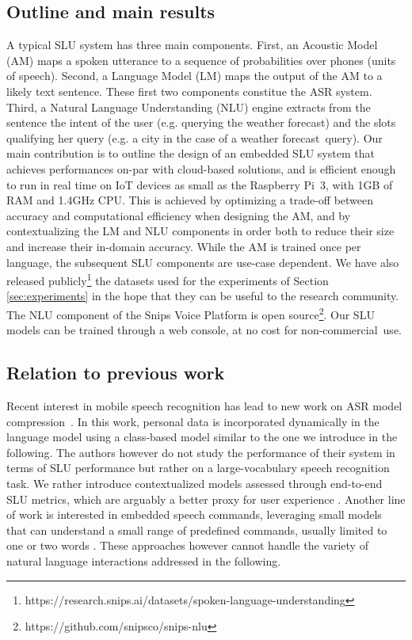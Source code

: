 \documentclass{article}
\begin{document}
\subsection{Outline and main results}
\label{sec:outline}
  A typical SLU system has three main components. 
  First, an Acoustic Model (AM) maps a spoken utterance to a sequence of probabilities over phones (units of speech). 
  Second, a Language Model (LM) maps the output of the AM to a likely text sentence. These first two components constitue the ASR system. Third, a Natural Language Understanding (NLU) engine extracts from the sentence the intent of the user (e.g. querying the weather forecast) and the slots qualifying her query (e.g. a city in the case of a weather forecast~query). 
  Our main contribution is to outline the design of an embedded SLU system that achieves performances on-par with cloud-based solutions, and is efficient enough to run in real time on IoT devices as small as the Raspberry Pi~3, with 1GB of RAM and 1.4GHz CPU.
  This is achieved by optimizing a trade-off between accuracy and computational efficiency when designing the AM, and by contextualizing the LM and NLU components in order both to reduce their size and increase their in-domain accuracy. While the AM is trained once per language, the subsequent SLU components are use-case dependent.
We have also released publicly\footnote{https://research.snips.ai/datasets/spoken-language-understanding} the datasets used for the experiments of Section \ref{sec:experiments} in the hope that they can be useful to the research community. 
  The NLU component of the Snips Voice Platform is open source\footnote{https://github.com/snipsco/snips-nlu}. Our SLU models can be trained through a web console, at no cost for non-commercial~use.

\subsection{Relation to previous work}
\label{sec:previous_work}
  Recent interest in mobile speech recognition has lead to new work on ASR model compression~\cite{mcgraw2016personalized}. 
  In this work, personal data is incorporated dynamically in the language model using a class-based model similar to the one we introduce in the following.
  The authors however do not study the performance of their system in terms of SLU performance but rather on a large-vocabulary speech recognition task. We rather introduce contextualized models assessed through end-to-end SLU metrics, which are arguably a better proxy for user experience \cite{wang2003word}. 
  Another line of work is interested in embedded speech commands, leveraging small models that can understand a small range of predefined commands, usually limited to one or two words \cite{warden2018speech}. 
  These approaches however cannot handle the variety of natural language interactions addressed in the following.
  
\end{document}

